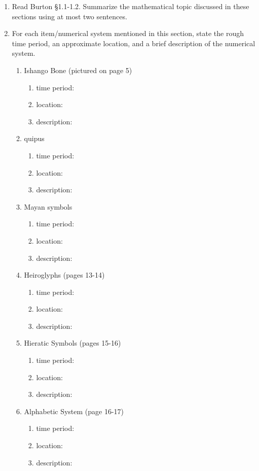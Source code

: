 \documentclass[12pt]{article}
\begin{document}
\begin{enumerate}
\item Read Burton \S 1.1-1.2. Summarize the mathematical topic discussed in these sections using at most two sentences.
\vspace{1in}
\item For each item/numerical system mentioned in this section, state the rough time period, an approximate location, and a brief description of the numerical system.
	\begin{enumerate}
	\item Ishango Bone (pictured on page   5)
		\begin{enumerate}
		\item time period:
		\item location:
		\item description:
		\vfill
		\end{enumerate}
	\item quipus
		\begin{enumerate}
		\item time period:
		\item location:
		\item description:
		\vfill
		\end{enumerate}
	\item Mayan symbols
		\begin{enumerate}
		\item time period:
		\item location:
		\item description:
		\vfill
		\end{enumerate}
	\item Heiroglyphs (pages 13-14)
		\begin{enumerate}
		\item time period:
		\item location:
		\item description:
		\vfill
		\end{enumerate}
	\item Hieratic Symbols (pages 15-16)
		\begin{enumerate}
		\item time period:
		\item location:
		\item description:
		\vfill
		\end{enumerate}
	\item Alphabetic System (page 16-17)
		\begin{enumerate}
		\item time period:
		\item location:
		\item description:
		\vfill
		\end{enumerate}
	\end{enumerate}
\end{enumerate}
\end{document}
